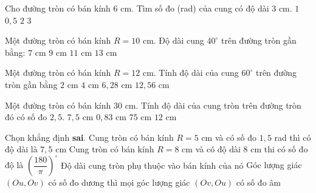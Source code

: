 \begin{ex}%
	Cho đường tròn có bán kính $6$ cm. Tìm số  đo (rad) của cung có độ dài $3$ cm.
	 \choice
		{$1$} 
		{\True $0{,}5$} 
		 {$2$}
		 {$3$}
\end{ex}

\begin{ex}%
	Một đường tròn có bán kính $R=10$ cm. Độ dài cung $40^{\circ}$ trên đường tròn gần bằng: 
	 \choice
		{\True $7$ cm} 
		{$9$ cm} 
		{$11$ cm} 
		 {$13$ cm}
\end{ex}

\begin{ex}%
	Một đường tròn có bán kính $R=12$ cm. Tính độ dài của  cung $60^\circ$ trên đường tròn gần bằng
	 \choice
		{$2$ cm} 
		{$4$ cm} 
		{$6{,}28$ cm} 
		 {\True $12{,}56$ cm}
\end{ex}

\begin{ex}%
	Một đường tròn có bán kính $30$ cm. Tính độ dài của cung tròn trên đường tròn  đó có số đo $2{,}5$.
	\choice 
		 {$7{,}5$ cm}
		{$0{,}83$  cm}
		{\True $75$ cm} 
		{$12$ cm} 
\end{ex}

\begin{ex}%
	Chọn  khẳng định \textbf{sai}.
	 \choice
		{Cung tròn có bán kính $R=5$ cm và có số đo $1{,}5$ rad thì có  độ dài là $7{,}5$ cm}
		{Cung tròn có bán kính $R=8$ cm và có độ dài $8$ cm thi có  số đo độ là $\left(\dfrac{180}{\pi} \right)^{\circ}$}
		{Độ dài cung tròn phụ  thuộc vào bán kính của nó}
		{\True Góc lượng giác $\left(Ou,Ov\right)$ có số đo dương thì mọi góc lượng giác $\left(Ov,Ou\right)$ có số đo âm} 
\end{ex}

